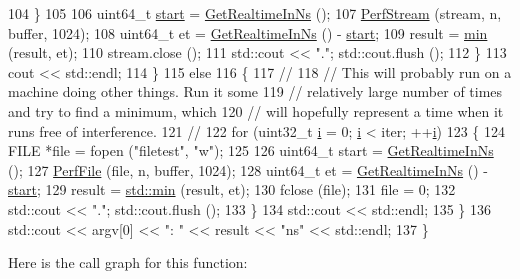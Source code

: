 \begin{DoxyCode}
104             \}
105 
106           uint64\_t \hyperlink{namespacevisualizer_1_1core_a2a35e5d8a34af358b508dac8635754e0}{start} = \hyperlink{perf-io_8cc_af641cbb1b31d6238aa887f2bea43864b}{GetRealtimeInNs} ();
107           \hyperlink{perf-io_8cc_a56edeee167f06792d972f3801d12b6c9}{PerfStream} (stream, n, buffer, 1024);
108           uint64\_t et = \hyperlink{perf-io_8cc_af641cbb1b31d6238aa887f2bea43864b}{GetRealtimeInNs} () - \hyperlink{namespacevisualizer_1_1core_a2a35e5d8a34af358b508dac8635754e0}{start};
109           result = \hyperlink{80211b_8c_ac6afabdc09a49a433ee19d8a9486056d}{min} (result, et);
110           stream.close ();
111           std::cout << \textcolor{stringliteral}{"."}; std::cout.flush ();
112         \}
113       cout << std::endl;
114     \}
115   \textcolor{keywordflow}{else}
116     \{
117       \textcolor{comment}{//}
118       \textcolor{comment}{// This will probably run on a machine doing other things.  Run it some}
119       \textcolor{comment}{// relatively large number of times and try to find a minimum, which}
120       \textcolor{comment}{// will hopefully represent a time when it runs free of interference.}
121       \textcolor{comment}{//}
122       \textcolor{keywordflow}{for} (uint32\_t \hyperlink{bernuolliDistribution_8m_a6f6ccfcf58b31cb6412107d9d5281426}{i} = 0; \hyperlink{bernuolliDistribution_8m_a6f6ccfcf58b31cb6412107d9d5281426}{i} < iter; ++\hyperlink{bernuolliDistribution_8m_a6f6ccfcf58b31cb6412107d9d5281426}{i})
123         \{
124           FILE *file = fopen (\textcolor{stringliteral}{"filetest"}, \textcolor{stringliteral}{"w"});
125 
126           uint64\_t start = \hyperlink{perf-io_8cc_af641cbb1b31d6238aa887f2bea43864b}{GetRealtimeInNs} ();
127           \hyperlink{perf-io_8cc_a0f69b54561b690d3307a394602cbbc87}{PerfFile} (file, n, buffer, 1024);
128           uint64\_t et = \hyperlink{perf-io_8cc_af641cbb1b31d6238aa887f2bea43864b}{GetRealtimeInNs} () - \hyperlink{namespacevisualizer_1_1core_a2a35e5d8a34af358b508dac8635754e0}{start};
129           result = \hyperlink{80211b_8c_ac6afabdc09a49a433ee19d8a9486056d}{std::min} (result, et);
130           fclose (file);
131           file = 0;
132           std::cout << \textcolor{stringliteral}{"."}; std::cout.flush ();
133         \}
134       std::cout << std::endl;
135     \}
136   std::cout << argv[0] << \textcolor{stringliteral}{": "} << result << \textcolor{stringliteral}{"ns"} << std::endl;
137 \}
\end{DoxyCode}


Here is the call graph for this function\+:



